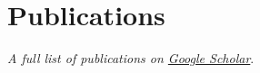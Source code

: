 \section{\sc Publications}
{\emph{A full list of publications  on \href{https://scholar.google.com/citations?user=IAc4JEUAAAAJ&hl=en}{Google Scholar}}.}
\begin{refcontext}[sorting=ydnt]
\nocite{*}
\printbibliography[heading=publications]
\end{refcontext}

\endinput